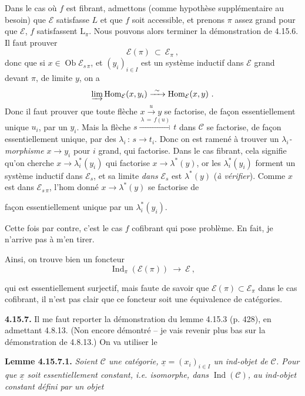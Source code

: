 \documentclass[11pt]{article}
\newcommand{\printedpage}[1]{\marginpar{\footnotesize p.~#1}}
\newcommand{\msp}[1]{\marginpar{\footnotesize [#1]}}
\newcommand{\cE}{\mathcal{E}}
\newcommand{\cC}{\mathcal{C}}
\newcommand{\Ob}{\operatorname{Ob}}
\newcommand{\Hom}{\operatorname{Hom}}
\newcommand{\Ind}{\operatorname{Ind}}
\newcommand{\ux}{\underline{x}}
\begin{document}
\msp{page 439}Dans le cas où $f$ est fibrant, admettons (comme hypothèse supplémentaire au besoin) que $\cE$ satisfasse $L$ et que $f$ soit accessible, et prenons $\pi$ assez grand pour que $\cE$, $f$ satisfassent $\mathrm{L}_{\pi}$. Nous pouvons alors terminer la démonstration de 4.15.6. Il faut prouver
\[
\cE(\pi) \ \subset \ \cE_{\pi} \ ,
\]
donc que si $x \in \Ob \cE_{s\,\pi}$, et $(y_i)_{i \in I}$ est un système inductif dans $\cE$ grand devant $\pi$, de limite $y$, on a
\[
\varinjlim \Hom_{\cE}(x, y_i) \xrightarrow{\ \sim\ } \Hom_{\cE}(x, y) \ .
\]
Donc il faut prouver que toute flèche $x \xrightarrow{u} y$ se factorise, de façon essentiellement unique $u_i$, par un $y_i$. Mais la flèche $s \xrightarrow{\ \lambda \, = \, f(u)\ } t$ dans $\cC$ se factorise, de façon essentiellement unique, par des $\lambda_i \, : \, s \longrightarrow t_i$. Donc on est ramené à trouver un \textit{$\lambda_i$-morphisme} $x \longrightarrow y_i$ pour $i$ grand, qui factorise. Dans le cas fibrant, cela signifie qu'on cherche $x \longrightarrow \lambda^*_i(y_i)$ qui factorise $x \longrightarrow \lambda^*(y)$, or les $\lambda^*_i(y_i)$ forment un système inductif dans $\cE_s$, et sa limite \textit{dans} $\cE_s$ est $\lambda^*(y)$ (\textit{à vérifier}). Comme $x$ est dans $\cE_{s\,\pi}$, l'hom donné $x \longrightarrow \lambda^*(y)$ se factorise de

\msp{page 440}façon essentiellement unique par un $\lambda^*_i(y_i)$.

Cette fois par contre, c'est le cas $f$ cofibrant qui pose problème. En fait, je n'arrive pas à m'en tirer.

Ainsi, on trouve bien un foncteur
\[
\Ind_{\pi}(\cE(\pi)) \ \longrightarrow \ \cE \ ,
\]

\setcounter{footnote}{183}

\printedpage{169}
qui est essentiellement surjectif, mais faute de savoir que $\mathcal{E}(\pi) \subset \mathcal{E}_\pi$ dans le cas cofibrant, il n'est pas clair que ce foncteur soit une équivalence de catégories.

\textbf{4.15.7.} Il me faut reporter la démonstration du lemme 4.15.3 (p. 428), en admettant 4.8.13. (Non encore démontré -- je vais revenir plus bas sur la démonstration de 4.8.13.) On va utiliser le

\textbf{Lemme 4.15.7.1.} \textit{Soient $\cC$ une catégorie, $\ux = (x_i)_{i\in I}$ un ind-objet de $\cC$. Pour que $\ux$ soit essentiellement constant, i.e. isomorphe, dans} $\Ind(\cC)$\textit{, au ind-objet constant défini par un objet}
\end{document}
